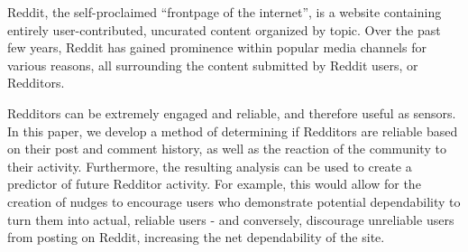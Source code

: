 Reddit, the self-proclaimed ``frontpage of the internet'', is a website
containing entirely user-contributed, uncurated content organized by topic. Over
the past few years, Reddit has gained prominence within popular media channels
for various reasons, all surrounding the content submitted by Reddit users, or
Redditors.
\newline

Redditors can be extremely engaged and reliable, and therefore useful as
sensors. In this paper, we develop a method of determining if Redditors are
reliable based on their post and comment history, as well as the reaction of the
community to their activity. Furthermore, the resulting analysis can be used to
create a predictor of future Redditor activity. For example, this would allow
for the creation of nudges to encourage users who demonstrate potential
dependability to turn them into actual, reliable users - and conversely,
discourage unreliable users from posting on Reddit, increasing the net
dependability of the site.

